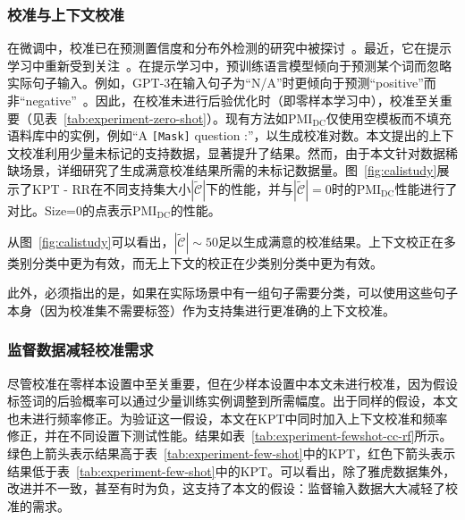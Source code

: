 \subsubsection{校准与上下文校准}
\label{app:supportsize}
在微调中，校准已在预测置信度和分布外检测的研究中被探讨~\cite{kong-etal-2020-calibrated}。最近，它在提示学习中重新受到关注~\cite{pmlr-v139-zhao21c, holtzman2021surface}。在提示学习中，预训练语言模型倾向于预测某个词而忽略实际句子输入。例如，GPT-3在输入句子为“N/A”时更倾向于预测“positive”而非“negative”~\cite{pmlr-v139-zhao21c}。因此，在校准未进行后验优化时（即零样本学习中），校准至关重要（见表~\ref{tab:experiment-zero-shot}）。现有方法如$\text{PMI}_\text{DC}$仅使用空模板而不填充语料库中的实例，例如“A \texttt{[Mask]} question :”，以生成校准对数。本文提出的上下文校准利用少量未标记的支持数据，显著提升了结果。然而，由于本文针对数据稀缺场景，详细研究了生成满意校准结果所需的未标记数据量。图~\ref{fig:calistudy}展示了KPT - RR在不同支持集大小$|\tilde{\mathcal{C}}|$下的性能，并与$|\tilde{\mathcal{C}}|=0$时的$\text{PMI}_\text{DC}$性能进行了对比。Size=0的点表示$\text{PMI}_\text{DC}$的性能。

从图~\ref{fig:calistudy}可以看出，$|\tilde{\mathcal{C}}|\sim 50$足以生成满意的校准结果。上下文校正在多类别分类中更为有效，而无上下文的校正在少类别分类中更为有效。

此外，必须指出的是，如果在实际场景中有一组句子需要分类，可以使用这些句子本身（因为校准集不需要标签）作为支持集进行更准确的上下文校准。

\subsubsection{监督数据减轻校准需求}
\label{app:fewshot-cali}
尽管校准在零样本设置中至关重要，但在少样本设置中本文未进行校准，因为假设标签词的后验概率可以通过少量训练实例调整到所需幅度。出于同样的假设，本文也未进行频率修正。为验证这一假设，本文在KPT中同时加入上下文校准和频率修正，并在不同设置下测试性能。结果如表~\ref{tab:experiment-fewshot-cc-rf}所示。绿色上箭头\gd 表示结果高于表~\ref{tab:experiment-few-shot}中的KPT，红色下箭头\bd 表示结果低于表~\ref{tab:experiment-few-shot}中的KPT。可以看出，除了雅虎数据集外，改进并不一致，甚至有时为负，这支持了本文的假设：监督输入数据大大减轻了校准的需求。

